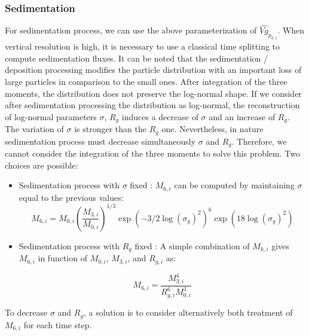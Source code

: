 \subsubsection*{Sedimentation}
For sedimentation process, we can use the above parameterization of 
$\hat{Vg}_{p_{k,i}}$. When
vertical resolution is high, it is necessary to use 
a classical time splitting to compute sedimentation fluxes.
It can be noted that the sedimentation / deposition processing modifies the 
particle distribution
with  an important loss of large particles in comparison to the small ones. 
After integration 
of the three moments, the distribution does not preserve the log-normal shape. 
If we consider after 
sedimentation processing the distribution as log-normal, the  
reconstruction of
log-normal parameters $\sigma$, $R_g$ induces a decrease of $\sigma$ and an 
increase of $R_g$. 
The variation of $\sigma$ is stronger than the $R_g$ one. Nevertheless, in nature
sedimentation process must decrease simultaneously  $\sigma$ and $R_g$.
 Therefore, we cannot consider the integration of the 
three moments to solve this problem. Two choices are possible:\\
\begin{itemize}
\item Sedimentation process with $\sigma$ fixed :
$M_{6,i}$ can be computed by maintaining $\sigma$ equal to the previous values:
\begin{equation}
M_{6,i} = M_{0,i} \left(\frac{M_{3,i}}{M_{0,i}} \right)^{1/3}  \exp \left( -3/2 
\log(\sigma_g)^2\right)^6  \exp\left(18 \log(\sigma_g)^2\right)
\label{sigmafix}
\end{equation}

\item Sedimentation process with $R_g$ fixed :
A simple combination of $M_{k,i}$ gives $M_{6,i}$ in function of $M_{0,i}$, 
$M_{3,i}$, and $R_{g,i}$ as:

\begin{equation}
M_{6,i} = \frac{M_{3,i}^4}{R_{g,i}^6 M_{0,i}^3}
\label{rgfix}
\end{equation}

\end{itemize}

To decrease $\sigma$ and $R_g$, a solution is to consider alternatively
both treatment of $M_{6,i}$ for each time step.

